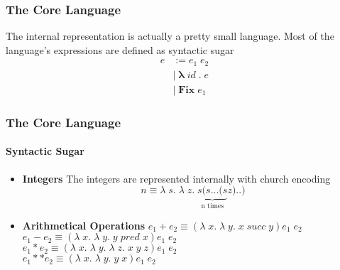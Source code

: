 \documentclass[xcolor=table]{beamer}
\newcommand{\bs}[1]{\boldsymbol{#1}}
\begin{document}
%

\begin{frame}
\frametitle{The Core Language}
\begin{block}{The internal representation is actually a pretty small language. Most of the language's expressions are defined as syntactic sugar}
\begin{align*}
e & := e_1 \; e_2 	 \\
   & | \; \bs{\lambda} \; id \; \bs{ .} \; e \\
   & | \; \bs{Fix} \; e_1                                                                 
\end{align*}
\end{block}
\end{frame}

%

\begin{frame}
\frametitle{The Core Language}
\framesubtitle{Syntactic Sugar}
\begin{itemize}
\item \textbf{Integers} The integers are represented internally with church encoding\\
$$n \equiv \lambda \;s.\; \lambda \; z. \; \underbrace{s(s ... (s }_\text{n times} z)..)$$
\item \textbf{Arithmetical Operations} $e_1 + e_2 \equiv (\lambda \; x. \; \lambda \; y.\; x \; succ \; y) e_1 \; e_2$\\
$e_1 - e_2 \equiv (\lambda \; x. \; \lambda \; y.\; y \; pred \; x) e_1 \; e_2$ \\
$e_1 * e_2 \equiv (\lambda \; x. \; \lambda \; y.\; \lambda \; z. \;  x \; y \; z) e_1 \; e_2$ \\
$e_1 ** e_2 \equiv (\lambda \; x. \; \lambda \; y.\;  y \; x ) e_1 \; e_2$ \\
\end{itemize}
\end{frame}
\end{document}
